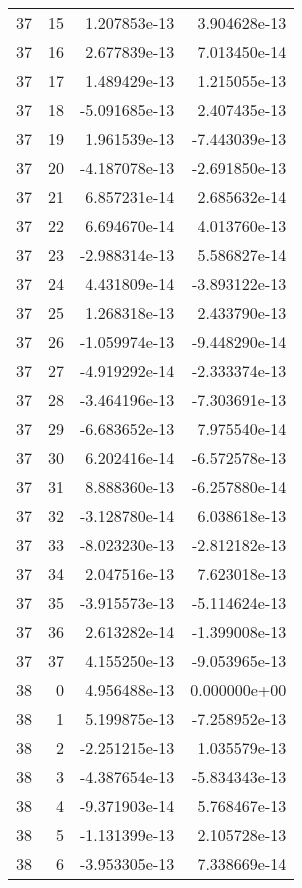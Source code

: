 \begin{tabular}{rrrr}
  37 &   15 &  1.207853e-13 &  3.904628e-13 \\
  37 &   16 &  2.677839e-13 &  7.013450e-14 \\
  37 &   17 &  1.489429e-13 &  1.215055e-13 \\
  37 &   18 & -5.091685e-13 &  2.407435e-13 \\
  37 &   19 &  1.961539e-13 & -7.443039e-13 \\
  37 &   20 & -4.187078e-13 & -2.691850e-13 \\
  37 &   21 &  6.857231e-14 &  2.685632e-14 \\
  37 &   22 &  6.694670e-14 &  4.013760e-13 \\
  37 &   23 & -2.988314e-13 &  5.586827e-14 \\
  37 &   24 &  4.431809e-14 & -3.893122e-13 \\
  37 &   25 &  1.268318e-13 &  2.433790e-13 \\
  37 &   26 & -1.059974e-13 & -9.448290e-14 \\
  37 &   27 & -4.919292e-14 & -2.333374e-13 \\
  37 &   28 & -3.464196e-13 & -7.303691e-13 \\
  37 &   29 & -6.683652e-13 &  7.975540e-14 \\
  37 &   30 &  6.202416e-14 & -6.572578e-13 \\
  37 &   31 &  8.888360e-13 & -6.257880e-14 \\
  37 &   32 & -3.128780e-14 &  6.038618e-13 \\
  37 &   33 & -8.023230e-13 & -2.812182e-13 \\
  37 &   34 &  2.047516e-13 &  7.623018e-13 \\
  37 &   35 & -3.915573e-13 & -5.114624e-13 \\
  37 &   36 &  2.613282e-14 & -1.399008e-13 \\
  37 &   37 &  4.155250e-13 & -9.053965e-13 \\
  38 &    0 &  4.956488e-13 &  0.000000e+00 \\
  38 &    1 &  5.199875e-13 & -7.258952e-13 \\
  38 &    2 & -2.251215e-13 &  1.035579e-13 \\
  38 &    3 & -4.387654e-13 & -5.834343e-13 \\
  38 &    4 & -9.371903e-14 &  5.768467e-13 \\
  38 &    5 & -1.131399e-13 &  2.105728e-13 \\
  38 &    6 & -3.953305e-13 &  7.338669e-14 \\

\end{tabular}
